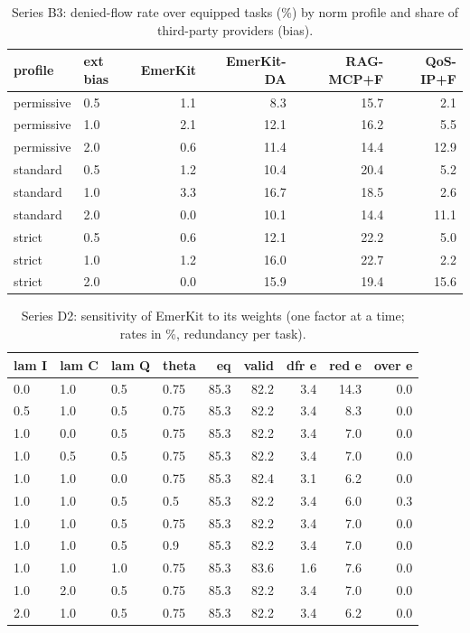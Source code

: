 \begin{table}[!ht]\centering\caption{Series B3: denied-flow rate over equipped tasks (\%) by norm profile and share of third-party providers (bias).}\label{tab:b3}\scriptsize
\begin{tabular}{llrrrr}\toprule
profile & ext bias & EmerKit & EmerKit-DA & RAG-MCP+F & QoS-IP+F \\ \midrule
permissive & 0.5 & 1.1 & 8.3 & 15.7 & 2.1 \\
permissive & 1.0 & 2.1 & 12.1 & 16.2 & 5.5 \\
permissive & 2.0 & 0.6 & 11.4 & 14.4 & 12.9 \\
standard & 0.5 & 1.2 & 10.4 & 20.4 & 5.2 \\
standard & 1.0 & 3.3 & 16.7 & 18.5 & 2.6 \\
standard & 2.0 & 0.0 & 10.1 & 14.4 & 11.1 \\
strict & 0.5 & 0.6 & 12.1 & 22.2 & 5.0 \\
strict & 1.0 & 1.2 & 16.0 & 22.7 & 2.2 \\
strict & 2.0 & 0.0 & 15.9 & 19.4 & 15.6 \\
\bottomrule\end{tabular}\end{table}
\begin{table}[!ht]\centering\caption{Series D2: sensitivity of EmerKit to its weights (one factor at a time; rates in \%, redundancy per task).}\label{tab:d2}\scriptsize
\begin{tabular}{llllrrrrr}\toprule
lam I & lam C & lam Q & theta & eq & valid & dfr e & red e & over e \\ \midrule
0.0 & 1.0 & 0.5 & 0.75 & 85.3 & 82.2 & 3.4 & 14.3 & 0.0 \\
0.5 & 1.0 & 0.5 & 0.75 & 85.3 & 82.2 & 3.4 & 8.3 & 0.0 \\
1.0 & 0.0 & 0.5 & 0.75 & 85.3 & 82.2 & 3.4 & 7.0 & 0.0 \\
1.0 & 0.5 & 0.5 & 0.75 & 85.3 & 82.2 & 3.4 & 7.0 & 0.0 \\
1.0 & 1.0 & 0.0 & 0.75 & 85.3 & 82.4 & 3.1 & 6.2 & 0.0 \\
1.0 & 1.0 & 0.5 & 0.5 & 85.3 & 82.2 & 3.4 & 6.0 & 0.3 \\
1.0 & 1.0 & 0.5 & 0.75 & 85.3 & 82.2 & 3.4 & 7.0 & 0.0 \\
1.0 & 1.0 & 0.5 & 0.9 & 85.3 & 82.2 & 3.4 & 7.0 & 0.0 \\
1.0 & 1.0 & 1.0 & 0.75 & 85.3 & 83.6 & 1.6 & 7.6 & 0.0 \\
1.0 & 2.0 & 0.5 & 0.75 & 85.3 & 82.2 & 3.4 & 7.0 & 0.0 \\
2.0 & 1.0 & 0.5 & 0.75 & 85.3 & 82.2 & 3.4 & 6.2 & 0.0 \\
\bottomrule\end{tabular}\end{table}
